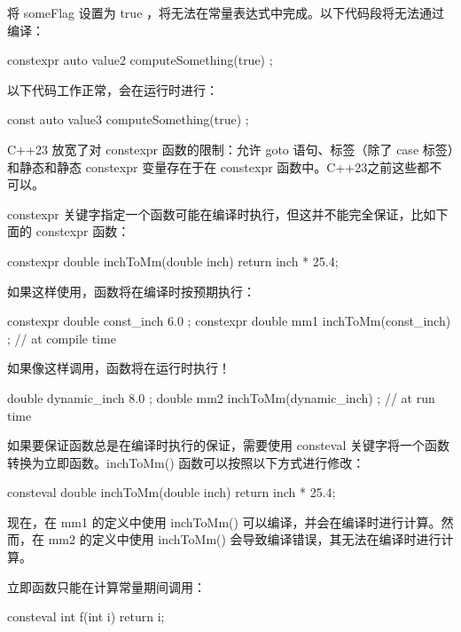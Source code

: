将 someFlag 设置为 true ，将无法在常量表达式中完成。以下代码段将无法通过编译：

\begin{cpp}
constexpr auto value2 { computeSomething(true) };
\end{cpp}

以下代码工作正常，会在运行时进行：

\begin{cpp}
const auto value3 { computeSomething(true) };
\end{cpp}

C++23 放宽了对 constexpr 函数的限制：允许 goto 语句、标签（除了 case 标签）和静态和静态 constexpr 变量存在于在 constexpr 函数中。C++23之前这些都不可以。



constexpr 关键字指定一个函数可能在编译时执行，但这并不能完全保证，比如下面的 constexpr 函数：

\begin{cpp}
constexpr double inchToMm(double inch) { return inch * 25.4; }
\end{cpp}

如果这样使用，函数将在编译时按预期执行：

\begin{cpp}
constexpr double const_inch { 6.0 };
constexpr double mm1 { inchToMm(const_inch) }; // at compile time
\end{cpp}

如果像这样调用，函数将在运行时执行！

\begin{cpp}
double dynamic_inch { 8.0 };
double mm2 { inchToMm(dynamic_inch) }; // at run time
\end{cpp}

如果要保证函数总是在编译时执行的保证，需要使用 consteval 关键字将一个函数转换为立即函数。inchToMm() 函数可以按照以下方式进行修改：

\begin{cpp}
consteval double inchToMm(double inch) { return inch * 25.4; }
\end{cpp}

现在，在 mm1 的定义中使用 inchToMm() 可以编译，并会在编译时进行计算。然而，在 mm2 的定义中使用 inchToMm() 会导致编译错误，其无法在编译时进行计算。

立即函数只能在计算常量期间调用：

\begin{cpp}
consteval int f(int i) { return i; }
\end{cpp}

